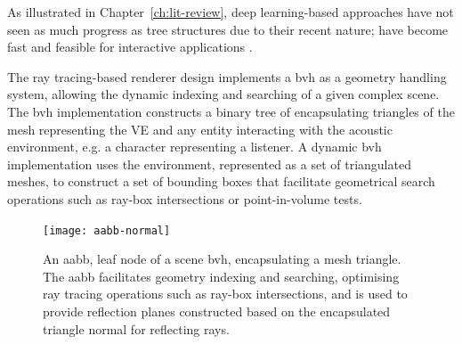 As illustrated in Chapter~\ref{ch:lit-review}, deep learning-based approaches have not seen as much progress as tree structures due to their recent nature;  have become fast and feasible for interactive applications \citep{kopta2012fast}.\par
The ray tracing-based renderer design implements a \acrfull{bvh} as a geometry handling system, allowing the dynamic indexing and searching of a given complex scene. The \acrshort{bvh} implementation constructs a binary tree of  encapsulating triangles of the mesh representing the VE and any entity interacting with the acoustic environment, e.g. a character representing a listener. 
A dynamic \acrshort{bvh} implementation uses the environment, represented as a set of triangulated meshes, to construct a set of bounding boxes that facilitate geometrical search operations such as ray-box intersections or point-in-volume tests.\par
\begin{figure}[h]
    \centering
    \texttt{[image: aabb-normal]}
    \caption[Use of Axis-Aligned Bounding Boxes in the ray tracer's geometry handling system]{An \acrfull{aabb}, leaf node of a scene \acrshort{bvh}, encapsulating a mesh triangle. The \acrshort{aabb} facilitates geometry indexing and searching, optimising ray tracing operations such as ray-box intersections, and is used to provide reflection planes constructed based on the encapsulated triangle normal for reflecting rays.}
    \label{fig:aabb-normal}
\end{figure}

